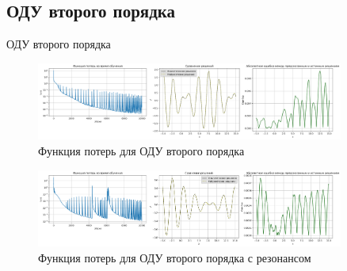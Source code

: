 \documentclass{beamer}
\begin{document}
\subsection{ОДУ второго порядка}
\begin{frame}{ОДУ второго порядка}
    \begin{figure}[h!]
        \centering
        \includegraphics[width=0.9\textwidth]{images/Loss&x_ODE_of_the_second_order.png}
        \caption{Функция потерь для ОДУ второго порядка}
        \label{fig:loss_second_order}
    \end{figure}
    \begin{figure}[h!]
        \centering
        \includegraphics[width=0.9\textwidth]{images/Loss&x_ODE_of_the_second_order_resonance.png}
        \caption{Функция потерь для ОДУ второго порядка с резонансом}
        \label{fig:loss_second_order_resonance}
    \end{figure}
\end{frame}
\end{document}
